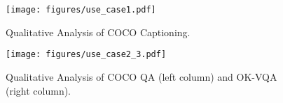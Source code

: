 \begin{figure}
    \centering
    \texttt{[image: figures/use\_case1.pdf]}
    \caption{Qualitative Analysis of COCO Captioning. 
    }
    \label{fig:case1}
\end{figure}


\begin{figure}
    \centering
    \texttt{[image: figures/use\_case2\_3.pdf]}
    \caption{Qualitative Analysis of COCO QA (left column) and OK-VQA (right column).}
    \label{fig:case2_3}
\end{figure}




